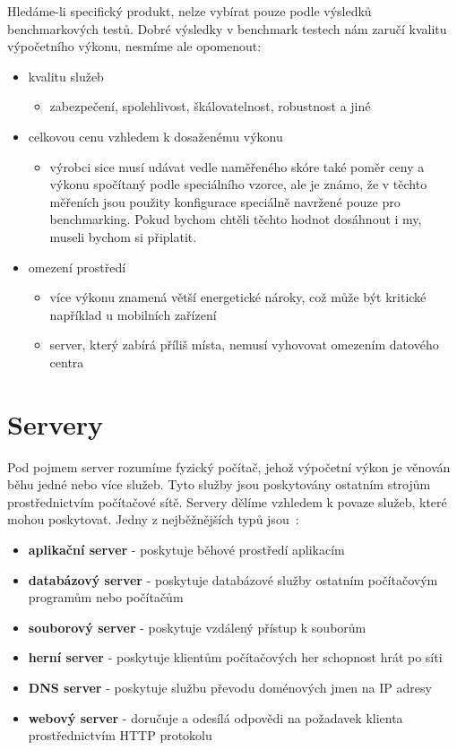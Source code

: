 \documentclass[122pt,oneside]{fithesis}
\begin{document}
Hledáme-li specifický produkt, nelze vybírat pouze podle výsledků benchmarkových testů. Dobré výsledky v benchmark testech nám zaručí kvalitu výpočetního výkonu, nesmíme ale opomenout:

\begin{itemize}
  \item kvalitu služeb
  \begin{itemize}
    \item zabezpečení, spolehlivost, škálovatelnost, robustnost a jiné
  \end{itemize}
  \item celkovou cenu vzhledem k dosaženému výkonu 
  \begin{itemize}
    \item  výrobci sice musí udávat vedle naměřeného skóre také poměr ceny a výkonu spočítaný podle speciálního vzorce, ale je známo, že v těchto měřeních jsou použity konfigurace speciálně navržené pouze pro benchmarking. Pokud bychom chtěli těchto hodnot dosáhnout i my, museli bychom si připlatit.
  \end{itemize}
  \item omezení prostředí
  \begin{itemize}
    \item více výkonu znamená větší energetické nároky, což může být kritické například u mobilních zařízení
    \item server, který zabírá příliš místa, nemusí vyhovovat omezením datového centra
  \end{itemize}
\end{itemize}

\section{Servery}

Pod pojmem server rozumíme fyzický počítač, jehož výpočetní výkon je věnován běhu jedné nebo více služeb. Tyto služby jsou poskytovány ostatním strojům prostřednictvím počítačové sítě. Servery dělíme vzhledem k povaze služeb, které mohou poskytovat. Jedny z nejběžnějších typů jsou~\cite{wikiServerComp}:
\begin{itemize}
  \item {\bf aplikační server} - poskytuje běhové prostředí aplikacím
  \item {\bf databázový server} - poskytuje databázové služby ostatním počítačovým programům nebo počítačům
  \item {\bf souborový server} - poskytuje vzdálený přístup k souborům
  \item {\bf herní server} - poskytuje klientům počítačových her schopnost hrát po síti
  \item {\bf DNS server} - poskytuje službu převodu doménových jmen na IP adresy
  \item {\bf webový server} - doručuje a odesílá odpovědi na požadavek klienta prostřednictvím HTTP protokolu
\end{itemize}
\end{document}
